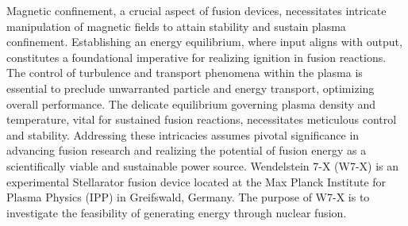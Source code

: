 \small{\indent Magnetic confinement, a crucial aspect of fusion devices, necessitates intricate manipulation of magnetic fields to attain stability and sustain plasma confinement. Establishing an energy equilibrium, where input aligns with output, constitutes a foundational imperative for realizing ignition in fusion reactions. The control of turbulence and transport phenomena within the plasma is essential to preclude unwarranted particle and energy transport, optimizing overall performance. The delicate equilibrium governing plasma density and temperature, vital for sustained fusion reactions, necessitates meticulous control and stability. Addressing these intricacies assumes pivotal significance in advancing fusion research and realizing the potential of fusion energy as a scientifically viable and sustainable power source. Wendelstein 7-X (\acrshort{W7-X}) is an experimental Stellarator fusion device located at the Max Planck Institute for Plasma Physics (IPP) in Greifswald, Germany. The purpose of \acrshort{W7-X} is to investigate the feasibility of generating energy through nuclear fusion.}

